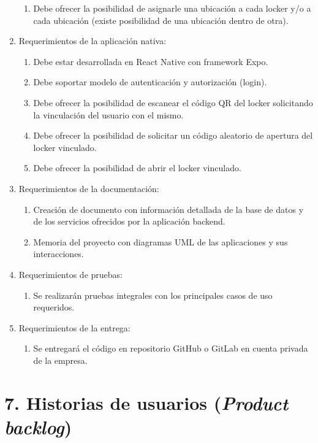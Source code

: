 \documentclass[
11pt, %
]{charter}
\begin{document}
\begin{enumerate}
\begin{enumerate}
			\item Debe ofrecer la posibilidad de asignarle una ubicación a cada locker y/o a cada ubicación (existe posibilidad de una ubicación dentro de otra).
		\end{enumerate}
	\item Requerimientos de la aplicación nativa:
		\begin{enumerate}
			\item Debe estar desarrollada en React Native con framework Expo.
			\item Debe soportar modelo de autenticación y autorización (login).
			\item Debe ofrecer la posibilidad de escanear el código QR del locker solicitando la vinculación del usuario con el mismo.
			\item Debe ofrecer la posibilidad de solicitar un código aleatorio de apertura del locker vinculado.
			\item Debe ofrecer la posibilidad de abrir el locker vinculado.
		\end{enumerate}
	\item Requerimientos de la documentación:
		\begin{enumerate}
			\item Creación de documento con información detallada de la base de datos y de los servicios ofrecidos por la aplicación backend.
			\item Memoria del proyecto con diagramas UML de las aplicaciones y sus interacciones.
		\end{enumerate}		
	\item Requerimientos de pruebas:
		\begin{enumerate}
			\item Se realizarán pruebas integrales con los principales casos de uso requeridos.
		\end{enumerate}		
	\item Requerimientos de la entrega:
		\begin{enumerate}
			\item Se entregará el código en repositorio GitHub o GitLab en cuenta privada de la empresa.
		\end{enumerate}
\end{enumerate}


\section{7. Historias de usuarios (\textit{Product backlog})}
\label{sec:backlog}
\end{document}
